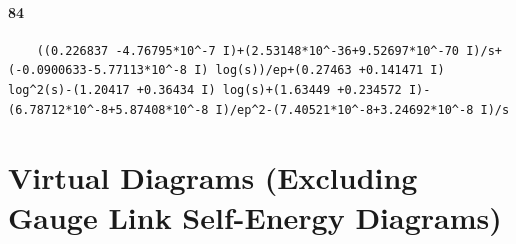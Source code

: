 \documentclass{article}
\def\FDWidth{3cm}
\def\FDHeight{3cm}
\begin{document}
\paragraph{84}
\begin{verbatim}
	((0.226837 -4.76795*10^-7 I)+(2.53148*10^-36+9.52697*10^-70 I)/s+(-0.0900633-5.77113*10^-8 I) log(s))/ep+(0.27463 +0.141471 I) log^2(s)-(1.20417 +0.36434 I) log(s)+(1.63449 +0.234572 I)-(6.78712*10^-8+5.87408*10^-8 I)/ep^2-(7.40521*10^-8+3.24692*10^-8 I)/s
\end{verbatim}

\clearpage
\section{Virtual Diagrams (Excluding Gauge Link Self-Energy Diagrams)}
\end{document}
